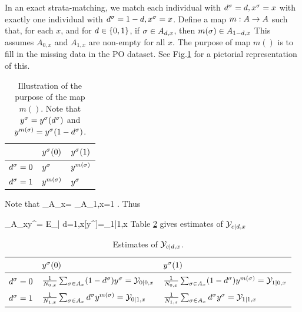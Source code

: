 In an exact   strata-matching,
we match each individual with
$ d^\sigma=d, x^\sigma=x$
with
exactly
one individual
with $ d^\sigma=1-d, x^\sigma=x$.
Define a map $m:A\rightarrow A$
such that,
for each $x$, and
for $d\in \{0,1\}$,
if $\sigma\in A_{d,x}$, then
$m(\sigma)\in A_{1-d,x}$ 
This assumes $A_{0,x}$ and $A_{1,x}$
are non-empty for all $x$.
The purpose of map $m()$
is
to fill in the missing data in the
PO dataset. See Fig.\ref{tab-po-s-map}
for a pictorial representation of 
this.

\begin{table}[h!]
\centering
\begin{tabular}{|l|l|l|}
\hline
 & \cellcolor[HTML]{ECF4FF}$y^\sigma(0)$ & \cellcolor[HTML]{ECF4FF}$y^\sigma(1)$ \\ \hline
\cellcolor[HTML]{ECF4FF}$ d^\sigma=0$ & $y^\sigma$ & $y^{m(\sigma)}$ \\ \hline
\cellcolor[HTML]{ECF4FF}$ d^\sigma=1$ & $y^{m(\sigma)}$ & $y^\sigma$ \\ \hline
\end{tabular}
\caption{Illustration of the
purpose of the map $m()$.
Note that $y^\sigma=y^\sigma( d^\sigma)$
 and $y^{m(\sigma)}=y^\sigma(1-d^\sigma)$.}
\label{tab-po-s-map}
\end{table}



Note that
\beq
\sum_{\s\in A_{x}}=
\sum_{\s\in A_{1,x}}=1
\;.
\eeq
Thus

\beq
\sum_{\s\in A_{x}}y^\s=
E_{\s| d=1,x}[y^\s]=\caly_{1|1,x}
\eeq
Table \ref{tab-po-yc-at-dx}
gives
estimates of
$ {\cal Y}_{c| d ,x}$

{\renewcommand{\arraystretch}{1.5}
\begin{table}[h!]
\centering
\begin{tabular}{|l|l|l|}
\hline
 & \cellcolor[HTML]{ECF4FF}$y^\sigma(0)$ 
& \cellcolor[HTML]{ECF4FF}$y^\sigma(1)$ 
\\ \hline
\cellcolor[HTML]{ECF4FF}$ d^\sigma=0$ 
& 
$\frac{1}{N_{0,x}}\sum_{\sigma\in A_x} (1- d^\sigma)y^{\sigma}={\cal Y}_{0|0,x}$
& 
$\frac{1}{N_{0,x}}\sum_{\sigma\in A_x} (1- d^\sigma) y^{m(\sigma)}={\cal Y}_{1|0,x}$
\\ \hline
\cellcolor[HTML]{ECF4FF}$ d^\sigma=1$ 
&
 $\frac{1}{N_{1,x}}\sum_{\sigma\in A_x}  d^\sigma y^{m(\sigma)}={\cal Y}_{0|1,x}$
& 
$\frac{1}{N_{1,x}}\sum_{\sigma\in A_x}  d^\sigma y^\sigma={\cal Y}_{1|1,x}$
\\ \hline
\end{tabular}
\caption{Estimates of
$ {\cal Y}_{c| d ,x}$.}
\label{tab-po-yc-at-dx}
\end{table}}

